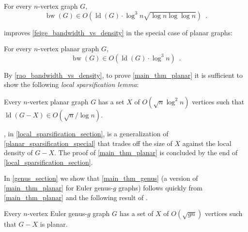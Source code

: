 \documentclass{patmorin}
\newcommand{\defin}[1]{\emph{\textcolor{brightmaroon}{#1}}}
\DeclareMathOperator{\bw}{bw}
\DeclareMathOperator{\ld}{ld}
\begin{document}
\begin{thm}\label{feige_bandwidth_vs_density}
  For every $n$-vertex graph $G$,
  \[
    \bw(G)\in O\left(\ld(G)\cdot \log^3 n\sqrt{\log n\log\log n}\right) \enspace .
  \]
\end{thm}

\citet{rao:small} improves \cref{feige_bandwidth_vs_density} in the special case of planar graphs:%

\begin{thm}
\label{rao_bandwidth_vs_density}
  For every $n$-vertex planar graph $G$,
  \[
    \bw(G)\in O\left(\ld(G)\cdot \log^3 n\right) \enspace .
  \]
\end{thm}

By \cref{rao_bandwidth_vs_density}, to prove \cref{main_thm_planar} it is sufficient to show the following \defin{local sparsification lemma}:

\begin{lem}\label{planar_sparsification_special}
  Every $n$-vertex planar graph $G$ has a set $X$ of $O(\sqrt{n}\log^2 n)$ vertices such that $\ld(G-X)\in O(\sqrt{n}/\log n)$.
\end{lem}


, in \cref{local_sparsification_section}, is a generalization of \cref{planar_sparsification_special} that trades off the size of $X$ against the local density of $G-X$.  The proof of \cref{main_thm_planar} is concluded by the end of \cref{local_sparsification_section}.

In \cref{genus_section} we show that \cref{main_thm_genus} (a version of \cref{main_thm_planar} for Euler genus-$g$ graphs) follows quickly from \cref{main_thm_planar} and the following result of \citet{eppstein:dynamic}.

\begin{thm}\label{eppstein_planarizer}
  Every $n$-vertex Euler genus-$g$ graph $G$ has a set of $X$ of $O(\sqrt{gn})$ vertices such that $G-X$ is planar.
\end{thm}
\end{document}
